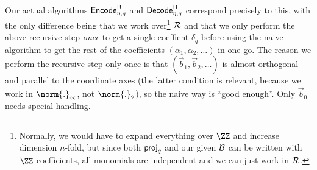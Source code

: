 \begin{remark}
Our actual algorithms $\mathsf{Encode}^{\textup{B}}_{\eta,q}$ and $\mathsf{Decode}^{\textup{B}}_{\eta,q}$ correspond precisely to this, with the only difference being that we work over\footnote{Normally, we would have to expand everything over $\ZZ$ and increase dimension $n$-fold, but since both $\mathsf{proj}_q$ and our given $\mathcal{B}$ can be written with $\ZZ$ coefficients, all monomials are independent and we can just work in $\mathcal{R}$.} $\mathcal{R}$ and that we only perform the above recursive step \emph{once} to get a single coeffient $\delta_q$ before using the naive algorithm to get the rest of the coefficients $(\alpha_1,\alpha_2,\ldots)$ in one go.
The reason we perform the recursive step only once is that $(\vec{b}_1,\vec{b}_2,\ldots)$ is almost orthogonal and parallel to the coordinate axes (the latter condition is relevant, because we work in $\norm{.}_\infty$, not $\norm{.}_2$), so the naive way is ``good enough''.
Only $\vec{b}_0$ needs special handling.
% 
% 
% 
% 
% 
% 
\end{remark}

